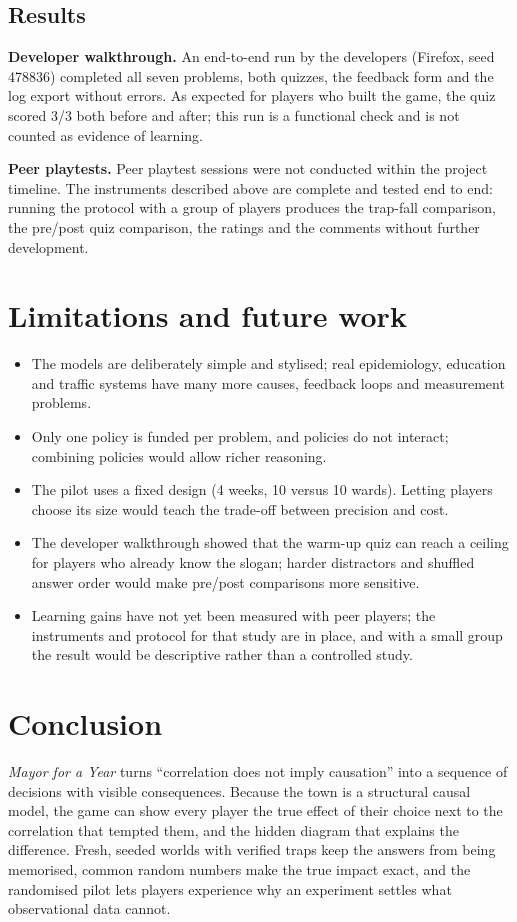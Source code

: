 \documentclass[11pt,a4paper]{article}
\begin{document}
\subsection{Results}
\textbf{Developer walkthrough.} An end-to-end run by the developers (Firefox, seed 478836) completed all seven problems,
both quizzes, the feedback form and the log export without errors. As expected for players who built the game, the quiz
scored 3/3 both before and after; this run is a functional check and is not counted as evidence of learning.

\textbf{Peer playtests.} Peer playtest sessions were not conducted within the project timeline. The instruments
described above are complete and tested end to end: running the protocol with a group of players produces the trap-fall
comparison, the pre/post quiz comparison, the ratings and the comments without further development.

\section{Limitations and future work}
\begin{itemize}
  \item The models are deliberately simple and stylised; real epidemiology, education and traffic systems have many more
  causes, feedback loops and measurement problems.
  \item Only one policy is funded per problem, and policies do not interact; combining policies would allow richer reasoning.
  \item The pilot uses a fixed design (4 weeks, 10 versus 10 wards). Letting players choose its size would teach the trade-off
  between precision and cost.
  \item The developer walkthrough showed that the warm-up quiz can reach a ceiling for players who already know the slogan;
  harder distractors and shuffled answer order would make pre/post comparisons more sensitive.
  \item Learning gains have not yet been measured with peer players; the instruments and protocol for that study are in place, and with a small group the result would be descriptive rather than a controlled study.
\end{itemize}

\section{Conclusion}
\emph{Mayor for a Year} turns ``correlation does not imply causation'' into a sequence of decisions with visible
consequences. Because the town is a structural causal model, the game can show every player the true effect of their
choice next to the correlation that tempted them, and the hidden diagram that explains the difference. Fresh, seeded worlds
with verified traps keep the answers from being memorised, common random numbers make the true impact exact, and the
randomised pilot lets players experience why an experiment settles what observational data cannot.
\end{document}
